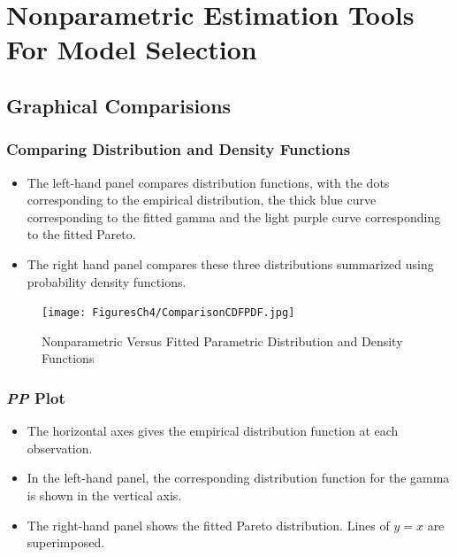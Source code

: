 \documentclass[]{book}
\begin{document}
\section{Nonparametric Estimation Tools For Model
Selection}\label{nonparametric-estimation-tools-for-model-selection}

\subsection{Graphical Comparisions}\label{graphical-comparisions}

\subsubsection{Comparing Distribution and Density
Functions}\label{comparing-distribution-and-density-functions}

\begin{itemize}
\item
  The left-hand panel compares distribution functions, with the dots
  corresponding to the empirical distribution, the thick blue curve
  corresponding to the fitted gamma and the light purple curve
  corresponding to the fitted Pareto.
\item
  The right hand panel compares these three distributions summarized
  using probability density functions.
\end{itemize}

\begin{figure}
\centering
\texttt{[image: FiguresCh4/ComparisonCDFPDF.jpg]}
\caption{Nonparametric Versus Fitted Parametric Distribution and Density
Functions}
\end{figure}

\subsubsection{\texorpdfstring{\emph{PP} Plot}{PP Plot}}\label{pp-plot}

\begin{itemize}
\item
  The horizontal axes gives the empirical distribution function at each
  observation.
\item
  In the left-hand panel, the corresponding distribution function for
  the gamma is shown in the vertical axis.
\item
  The right-hand panel shows the fitted Pareto distribution. Lines of
  \(y=x\) are superimposed.
\end{itemize}
\end{document}
